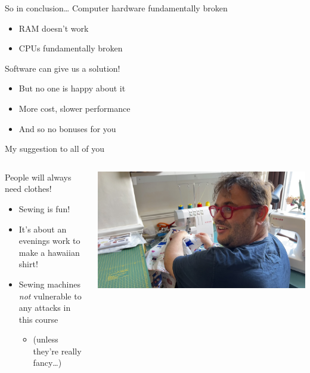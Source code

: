 \documentclass[9pt,aspectratio=169]{beamer}
\begin{document}
\begin{frame}[label={sec:org60962f5}]{So in conclusion\ldots{}}
Computer hardware fundamentally broken
\begin{itemize}
\item RAM doesn't work
\item CPUs fundamentally broken
\end{itemize}

Software can give us a solution!
\begin{itemize}
\item But no one is happy about it
\item More cost, slower performance
\item And so no bonuses for you
\end{itemize}
\end{frame}

\begin{frame}[label={sec:orgd079296}]{My suggestion to all of you}
\begin{columns}
\begin{column}[t]{0.6\columnwidth}
\begin{block}{People will always need clothes!}
\begin{itemize}
\item Sewing is fun!
\item It's about an evenings work to make a hawaiian shirt!
\item Sewing machines \emph{not} vulnerable to any attacks in this course
\begin{itemize}
\item (unless they're really fancy\ldots{})
\end{itemize}
\end{itemize}
\end{block}
\end{column}



\begin{column}[t]{0.4\columnwidth}
\begin{center}
\includegraphics[width=\linewidth]{./sewing.jpeg}
\end{center}
\end{column}
\end{columns}
\end{frame}
\end{document}
